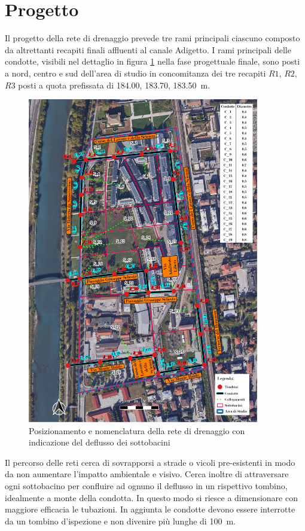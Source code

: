 \section{Progetto}
Il progetto della rete di drenaggio prevede tre rami principali ciascuno composto da altrettanti recapiti finali affluenti al canale Adigetto. 
I rami principali delle condotte, visibili nel dettaglio in figura \ref{fig:Condotte} nella fase progettuale finale, sono posti a nord, centro e sud dell'area di studio in concomitanza dei tre recapiti $R1$, $R2$, $R3$ posti a quota prefissata di \SI{184.00}{}, \SI{183.70}{}, \SI{183.50}{\metre}.
\begin{figure}[p]
    \centering
    \includegraphics[trim=0cm 0cm 0cm 0cm,clip,frame,width=0.9\textwidth]{IMG/Nomenclatura_condotte.pdf} 
    \caption{Posizionamento e nomenclatura della rete di drenaggio con indicazione del deflusso dei sottobacini}
    \label{fig:Condotte}
\end{figure}

Il percorso delle reti cerca di sovrapporsi a strade o vicoli pre-esistenti in modo da non aumentare l'impatto ambientale e visivo. 
Cerca inoltre di attraversare ogni sottobacino per confluire ad ognuno il deflusso in un rispettivo tombino, idealmente a monte della condotta. 
In questo modo si riesce a dimensionare con maggiore efficacia le tubazioni. 
In aggiunta le condotte devono essere interrotte da un tombino d'ispezione e non divenire più lunghe di \SI{100}{\metre}.

